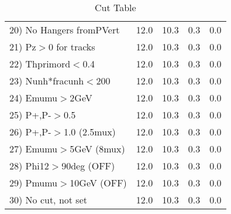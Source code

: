 \begin{table}[h!]
\begin{tabular}{||l||r|r|r|r||}
 20) No Hangers fromPVert &        12.0 &        10.3 &         0.3 &         0.0 \\
 21) Pz$>$0 for tracks    &        12.0 &        10.3 &         0.3 &         0.0 \\
 22) Thprimord$<$0.4      &        12.0 &        10.3 &         0.3 &         0.0 \\
 23) Nunh*fracunh$<$200   &        12.0 &        10.3 &         0.3 &         0.0 \\
 24) Emumu$>$2GeV         &        12.0 &        10.3 &         0.3 &         0.0 \\
 25) P+,P-$>$0.5          &        12.0 &        10.3 &         0.3 &         0.0 \\
 26) P+,P-$>$1.0 (2.5mux) &        12.0 &        10.3 &         0.3 &         0.0 \\
 27) Emumu$>$5GeV  (8mux) &        12.0 &        10.3 &         0.3 &         0.0 \\
 28) Phi12$>$90deg  (OFF) &        12.0 &        10.3 &         0.3 &         0.0 \\
 29) Pmumu$>$10GeV  (OFF) &        12.0 &        10.3 &         0.3 &         0.0 \\
 30) No cut, not set      &        12.0 &        10.3 &         0.3 &         0.0 \\
 \hline
 \hline
 \end{tabular}
 \caption{Cut Table \cohpip }
 \label{tab-cut_copip}
 \end{table}

